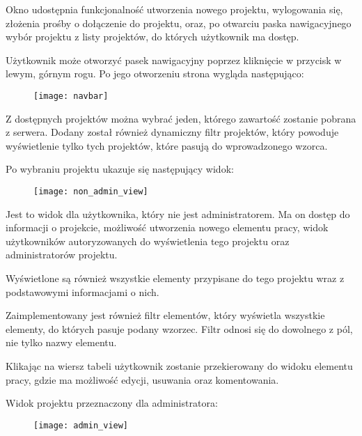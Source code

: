 \documentclass[11pt, titlepage]{article}
\begin{document}
Okno udostępnia funkcjonalność utworzenia nowego projektu, wylogowania się, złożenia prośby o dołączenie do projektu, oraz, po otwarciu paska nawigacyjnego wybór projektu z listy projektów, do których użytkownik ma dostęp.

\break

Użytkownik może otworzyć pasek nawigacyjny poprzez kliknięcie w przycisk w lewym, górnym rogu. Po jego otworzeniu strona wygląda następująco:

\begin{figure}[H]
\begin{adjustwidth}{-3cm}{}
\texttt{[image: navbar]}
\end{adjustwidth}
\end{figure}

Z dostępnych projektów można wybrać jeden, którego zawartość zostanie pobrana z serwera. Dodany został również dynamiczny filtr projektów, który powoduje wyświetlenie tylko tych projektów, które pasują do wprowadzonego wzorca.

\break

Po wybraniu projektu ukazuje się następujący widok:

\begin{figure}[H]
\begin{adjustwidth}{-3cm}{}
\texttt{[image: non\_admin\_view]}
\end{adjustwidth}
\end{figure}

Jest to widok dla użytkownika, który nie jest administratorem. Ma on dostęp do informacji o projekcie, możliwość utworzenia nowego elementu pracy, widok użytkowników autoryzowanych do wyświetlenia tego projektu oraz administratorów projektu.

Wyświetlone są również wszystkie elementy przypisane do tego projektu wraz z podstawowymi informacjami o nich.

Zaimplementowany jest również filtr elementów, który wyświetla wszystkie elementy,  do których pasuje podany wzorzec. Filtr odnosi się do dowolnego z pól, nie tylko nazwy elementu.

Klikając na wiersz tabeli użytkownik zostanie przekierowany do widoku elementu pracy, gdzie ma możliwość edycji, usuwania oraz komentowania.

\break

Widok projektu przeznaczony dla administratora:

\begin{figure}[H]
\begin{adjustwidth}{-3cm}{}
\texttt{[image: admin\_view]}
\end{adjustwidth}
\end{figure}
\end{document}
